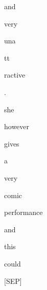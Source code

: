 \documentclass[varwidth=150mm]{standalone}
\begin{document}
\begin{CJK*}{UTF8}{gbsn}
{{{\colorbox{red!1.5000861883163452}{\strut and} \colorbox{red!2.216320753097534}{\strut very} \colorbox{red!0.0}{\strut una}\colorbox{red!0.0}{\strut tt}\colorbox{red!0.0}{\strut ractive} \colorbox{red!0.0}{\strut .} \colorbox{red!4.113585472106934}{\strut she} \colorbox{red!0.0}{\strut however} \colorbox{red!0.0}{\strut gives} \colorbox{red!1.249947428703308}{\strut a} \colorbox{red!2.350152015686035}{\strut very} \colorbox{red!1.5155121088027954}{\strut comic} \colorbox{red!4.122635841369629}{\strut performance} \colorbox{red!21.062074661254883}{\strut and} \colorbox{red!5.284885883331299}{\strut this} \colorbox{red!18.374940872192383}{\strut could} \colorbox{red!10.645689010620117}{\strut [SEP]}
}}}
\end{CJK*}
\end{document}
